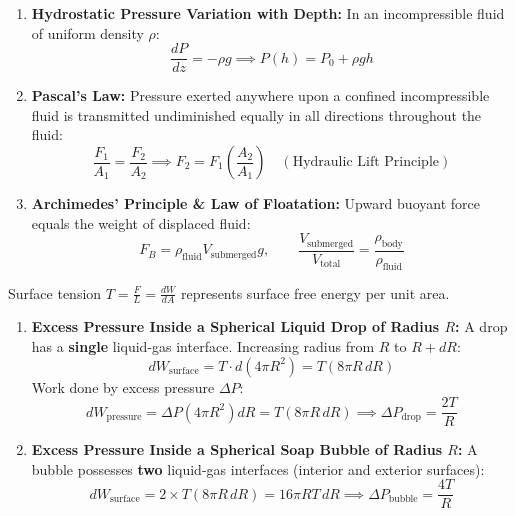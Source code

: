 \documentclass[10pt,a4paper]{article}
\begin{document}
\begin{conceptbox}
\begin{enumerate}[leftmargin=*]
  \item \textbf{Hydrostatic Pressure Variation with Depth:} In an incompressible fluid of uniform density $\rho$:
  \begin{equation}
    \frac{dP}{dz} = -\rho g \implies P(h) = P_0 + \rho g h
  \end{equation}
  \item \textbf{Pascal's Law:} Pressure exerted anywhere upon a confined incompressible fluid is transmitted undiminished equally in all directions throughout the fluid:
  \begin{equation}
    \frac{F_1}{A_1} = \frac{F_2}{A_2} \implies F_2 = F_1\left(\frac{A_2}{A_1}\right) \quad (\text{Hydraulic Lift Principle})
  \end{equation}
  \item \textbf{Archimedes' Principle \& Law of Floatation:} Upward buoyant force equals the weight of displaced fluid:
  \begin{equation}
    F_B = \rho_{\text{fluid}} V_{\text{submerged}} g, \qquad \frac{V_{\text{submerged}}}{V_{\text{total}}} = \frac{\rho_{\text{body}}}{\rho_{\text{fluid}}}
  \end{equation}
\end{enumerate}
\end{conceptbox}

\begin{formulabox}
Surface tension $T = \frac{F}{L} = \frac{dW}{dA}$ represents surface free energy per unit area.
\begin{enumerate}[leftmargin=*]
  \item \textbf{Excess Pressure Inside a Spherical Liquid Drop of Radius $R$:}
  A drop has a \textbf{single} liquid-gas interface. Increasing radius from $R$ to $R+dR$:
  \begin{equation}
    dW_{\text{surface}} = T \cdot d(4\pi R^2) = T(8\pi R\,dR)
  \end{equation}
  Work done by excess pressure $\Delta P$:
  \begin{equation}
    dW_{\text{pressure}} = \Delta P(4\pi R^2)dR = T(8\pi R\,dR) \implies \Delta P_{\text{drop}} = \frac{2T}{R}
  \end{equation}
  \item \textbf{Excess Pressure Inside a Spherical Soap Bubble of Radius $R$:}
  A bubble possesses \textbf{two} liquid-gas interfaces (interior and exterior surfaces):
  \begin{equation}
    dW_{\text{surface}} = 2 \times T(8\pi R\,dR) = 16\pi R T\,dR \implies \Delta P_{\text{bubble}} = \frac{4T}{R}
  \end{equation}
\end{enumerate}
\end{formulabox}
\end{document}

